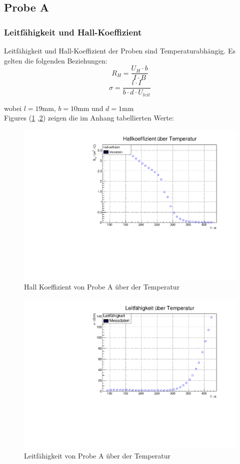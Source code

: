 
\subsection{Probe A}
\subsubsection{Leitfähigkeit und Hall-Koeffizient}

Leitfähigkeit und Hall-Koeffizient der Proben sind Temperaturabhängig.
Es gelten die folgenden Beziehungen:
$$R_H = \frac{U_{H} \cdot b}{ I \cdot B }$$
$$\sigma = \frac{l \cdot I}{b \cdot d \cdot U_{leit}}$$

wobei $l = 19 \text{mm}$, $b = 10 \text{mm}$ und $d = 1 \text{mm}$
\\
Figures (\ref{fig:R_H} ,\ref{fig:sigma}) zeigen die im  Anhang tabellierten Werte:

\begin{figure}
\label{fig:R_H}
\centering
\includegraphics[scale = 0.5]{../data/A1R_h.pdf}
\caption{Hall Koeffizient von Probe A über der Temperatur}
\end{figure}

\begin{figure}
\label{fig:sigma}
\centering
\includegraphics[scale = 0.5]{../data/A1sigma.pdf}
\caption{Leitfähigkeit von Probe A über der Temperatur}
\end{figure}


